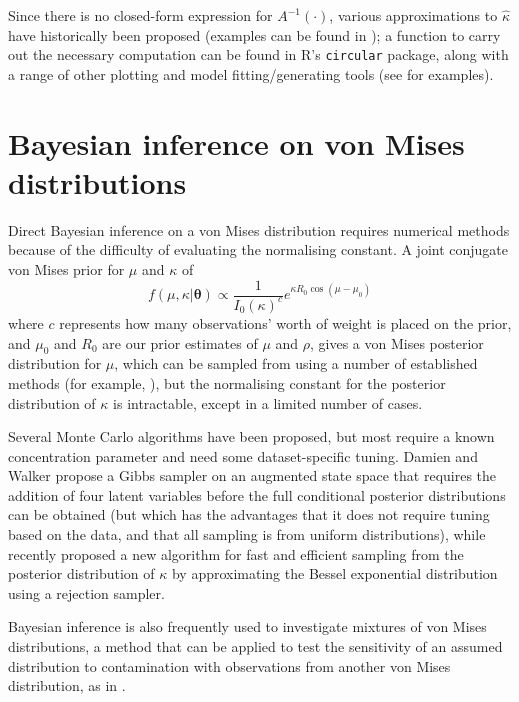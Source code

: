 \documentclass[12pt,fleqn]{article}
\begin{document}
Since there is no closed-form expression for $A^{-1}(\cdot)$, various approximations to $\hat{\kappa}$ have historically been proposed (examples can be found in \cite{Mardia1999}); a function to carry out the necessary computation can be found in R's \texttt{circular} package, along with a range of other plotting and model fitting/generating tools (see \cite{Pewsey2014} for examples).




\section{Bayesian inference on von Mises distributions}
Direct Bayesian inference on a von Mises distribution requires numerical methods because of the difficulty of evaluating the normalising constant. A joint conjugate von Mises prior for $\mu$ and $\kappa$ of
\[f(\mu, \kappa|\mathbf{\theta}) \propto \frac{1}{I_0(\kappa)^c} e^{\kappa R_0 \cos(\mu - \mu_0)} \]
where $c$ represents how many observations' worth of weight is placed on the prior, and  $\mu_0$ and $R_0$ are our prior estimates of $\mu$ and $\rho$, gives a von Mises posterior distribution for $\mu$, which can be sampled from using a number of established methods (for example, \cite{Best1979}), but the normalising constant for the posterior distribution of $\kappa$ is intractable, except in a limited number of cases.

Several Monte Carlo algorithms have been proposed, but most require a known concentration parameter and need some dataset-specific tuning. Damien and Walker \cite{Damien1999} propose a Gibbs sampler on an augmented state space that requires the addition of four latent variables before the full conditional posterior distributions can be obtained (but which has the advantages that it does not require tuning based on the data, and that all sampling is from uniform distributions), while \cite{Forbes2015} recently proposed a new algorithm for fast and efficient sampling from the posterior distribution of $\kappa$ by approximating the Bessel exponential distribution using a rejection sampler.


Bayesian inference is also frequently used to investigate mixtures of von Mises distributions, a method that can be applied to test the sensitivity of an assumed distribution to contamination with observations from another von Mises distribution, as in \cite{Bagchi1990}.

\newpage

\printbibliography
\end{document}

